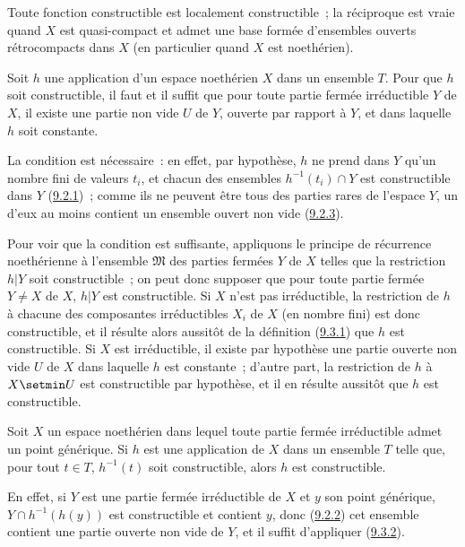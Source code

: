 Toute fonction constructible est localement constructible~; la réciproque
est vraie quand $X$ est quasi-compact et admet une base formée d'ensembles
ouverts rétrocompacts dans $X$ (en particulier quand $X$ est noethérien).

\begin{proposition}[9.3.2]
\label{0.9.3.2-fr}
Soit $h$ une application d'un espace noethérien $X$ dans un ensemble $T$.
Pour que $h$ soit constructible, il faut et il suffit que pour toute partie
fermée irréductible $Y$ de $X$, il existe une partie non vide $U$ de $Y$,
ouverte par rapport à $Y$, et dans laquelle $h$ soit constante.
\end{proposition}

La condition est nécessaire~: en effet, par hypothèse, $h$ ne prend dans $Y$
qu'un nombre fini de valeurs $t_i$, et chacun des ensembles
$h^{-1}(t_i)\cap Y$ est constructible dans $Y$
(\hyperref[0.9.2.1-fr]{9.2.1})~; comme ils ne peuvent être tous des parties
rares de l'espace $Y$, un d'eux au moins contient un ensemble ouvert non vide
(\hyperref[0.9.2.3-fr]{9.2.3}).

Pour voir que la condition est suffisante, appliquons le principe de
récurrence noethérienne à l'ensemble $\mathfrak{M}$ des parties fermées $Y$
de $X$ telles que la restriction $h|Y$ soit constructible~; on peut donc
supposer que pour toute partie fermée $Y\ne X$ de $X$, $h|Y$ est
constructible. Si $X$ n'est pas irréductible, la restriction de $h$ à
chacune des composantes irréductibles $X_i$ de $X$ (en nombre fini) est donc
constructible, et il résulte alors aussitôt de la définition
(\hyperref[0.9.3.1-fr]{9.3.1}) que $h$ est constructible. Si $X$ est
irréductible, il existe par hypothèse une partie ouverte non vide $U$ de $X$
dans laquelle $h$ est constante~; d'autre part, la restriction de $h$ à
$X\setmin U$ est constructible par hypothèse, et il en résulte aussitôt
que $h$ est constructible.

\begin{corollary}[9.3.3]
\label{0.9.3.3-fr}
Soit $X$ un espace noethérien dans lequel toute partie fermée irréductible
admet un point générique. Si $h$ est une application de $X$ dans un ensemble
$T$ telle que, pour tout $t\in T$, $h^{-1}(t)$ soit constructible, alors $h$
est constructible.
\end{corollary}

En effet, si $Y$ est une partie fermée irréductible de $X$ et $y$ son point
générique, $Y\cap h^{-1}(h(y))$ est constructible et contient $y$, donc
(\hyperref[0.9.2.2-fr]{9.2.2}) cet ensemble contient une partie ouverte non
vide de $Y$, et il suffit d'appliquer (\hyperref[0.9.3.2-fr]{9.3.2}).

